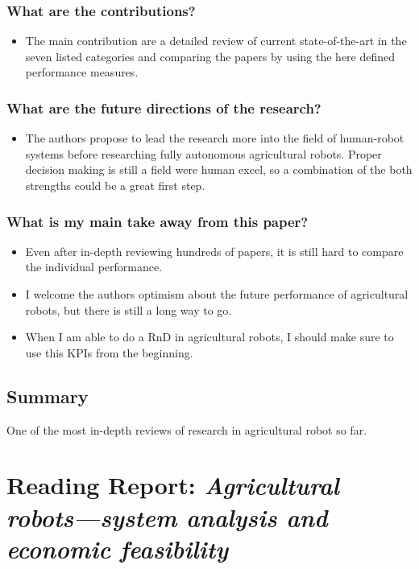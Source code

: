     \subsubsection*{What are the contributions?}
    \begin{itemize}
        \item The main contribution are a detailed review of current state-of-the-art in the seven listed categories and comparing the papers by using the here defined performance measures.
    \end{itemize}
    \subsubsection*{What are the future directions of the research?}
    \begin{itemize}
        \item The authors propose to lead the research more into the field of human-robot systems before researching fully autonomous agricultural robots. Proper decision making is still a field were human excel, so a combination of the both strengths could be a great first step.
    \end{itemize}
    \subsubsection*{What is my main take away from this paper?}
    \begin{itemize}
        \item Even after in-depth reviewing hundreds of papers, it is still hard to compare the individual performance. 
        \item I welcome the authors optimism about the future performance of agricultural robots, but there is still a long way to go.
        \item When I am able to do a RnD in agricultural robots, I should make sure to use this KPIs from the beginning.
    \end{itemize}

    \subsection*{Summary}
    One of the most in-depth reviews of research in agricultural robot so far.

   \newpage
    \section{Reading Report: \emph{Agricultural robots—system analysis and economic feasibility}}
    \label{sec:Pedersen2006}
    \cite{Pedersen2006}
    
